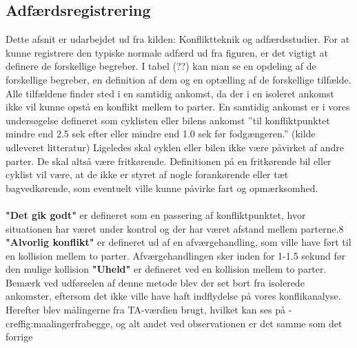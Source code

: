 \subsection{Adfærdsregistrering}
\label{sub:adfregis}
Dette afsnit er udarbejdet ud fra kilden: Konfliktteknik og adfærdsstudier.
For	at kunne registrere den typiske normale adfærd ud	 fra figuren, er det vigtigt at definere	de	forskellige	begreber. I tabel (??) kan man se en	opdeling af de forskellige begreber, en definition af dem og en optælling af de forskellige tilfælde. Alle	tilfældene finder sted i	en samtidig ankomst, da der i en isoleret ankomst	 ikke vil kunne	opstå en konflikt mellem to parter. En samtidig ankomst er i vores undersøgelse defineret som cyklisten eller bilens ankomst ”til konfliktpunktet mindre end 2.5 sek efter eller mindre end 1.0 sek før fodgængeren.” (kilde udleveret	litteratur)	Ligeledes skal cyklen	eller bilen ikke være påvirket af andre parter. De skal altså være fritkørende. Definitionen på en fritkørende bil eller cyklist	vil	være, at de ikke er styret af nogle	forankørende eller tæt bagvedkørende, som eventuelt ville kunne påvirke fart og opmærksomhed.
\\\\
\textbf{"Det	gik	godt"} er defineret som en passering af konfliktpunktet, hvor situationen
har	været under kontrol og der har været afstand mellem parterne.8
\textbf{"Alvorlig konflikt"}	er defineret ud af en afværgehandling, som ville have ført til en kollision mellem to parter. Afværgehandlingen sker inden for 1-1.5 sekund før den mulige	kollision%
\textbf{"Uheld"} er defineret ved en kollision mellem to parter.
Bemærk ved udførselen af denne metode blev der set bort fra isolerede ankomster, eftersom det ikke ville have haft indflydelse på vores konflikanalyse. Herefter blev målingerne fra TA-værdien brugt, hvilket kan ses på -cref{fig:maalingerfrabegge}, og alt andet ved observationen er det samme som det forrige %
